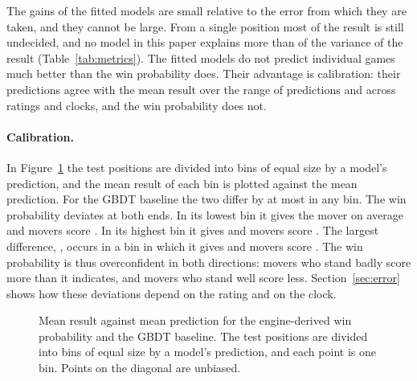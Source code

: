 \documentclass[11pt]{article}
\begin{document}
The gains of the fitted models are small relative to the error from which
they are taken, and they cannot be large. From a single position most of the
result is still undecided, and no model in this paper explains more than
 of the variance of the result (Table~\ref{tab:metrics}). The
fitted models do not predict individual games much better than the win
probability does. Their advantage is calibration: their predictions agree
with the mean result over the range of predictions and across ratings and
clocks, and the win probability does not.

\iflook
\paragraph{Calibration.}
In Figure~\ref{fig:reliability} the test positions are divided into
 bins of equal size by a model's prediction,
and the mean result of each bin is plotted against the mean prediction. For
the GBDT baseline the two differ by at most
 in any bin. The win probability deviates
at both ends. In its lowest bin it gives the mover
 on average and movers score
. In its highest bin it gives
 and movers score
. The largest difference,
, occurs in a bin in which it
gives  and movers score
. The win probability is
thus overconfident in both directions: movers who stand badly score more than
it indicates, and movers who stand well score less.
Section~\ref{sec:error} shows how these deviations depend on the rating and
on the clock.

\begin{figure}[htbp]\centering
{}
\caption{Mean result against mean prediction for the engine-derived win
probability and the GBDT baseline. The test positions are divided into bins
of equal size by a model's prediction, and each point is one bin. Points on
the diagonal are unbiased.}
\label{fig:reliability}
\end{figure}
\end{document}
